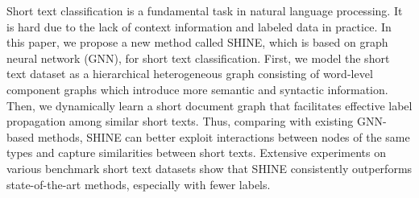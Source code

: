 Short text classification is a fundamental task in natural language processing.  It is hard due to the lack of context information and labeled data in practice. In this paper, we propose a new method called SHINE, which is based on graph neural network (GNN), for short text classification. First, we model the short text dataset as a hierarchical heterogeneous graph consisting of word-level component graphs which introduce more semantic and syntactic information. Then, we dynamically learn a short document graph that facilitates effective label propagation among similar short texts. Thus, comparing with existing GNN-based methods, SHINE can better exploit interactions between nodes of the same types and capture similarities between short texts. Extensive experiments on various benchmark short text datasets show that SHINE consistently outperforms state-of-the-art methods, especially with fewer labels.
